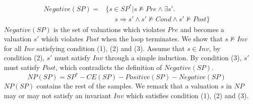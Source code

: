 \begin{align*}
    Negative(SP) = & \{s \in SP^* | s \not \models \mathit{Pre} \land \exists s'. \\
    & ~~~~~~s \Rightarrow s' \land s' \not \models Cond \land s' \not \models Post\}
\end{align*}
$Negative(SP)$ is the set of valuations which violates $Pre$ and becomes a valuation $s'$ which violates $Post$ when the loop terminates. We show that $s \not \models Inv$ for all $Inv$ satisfying condition (1), (2) and (3). Assume that $s \in Inv$, by condition (2), $s'$ must satisfy $Inv$ through a simple induction. By condition (3), $s'$ must satisfy $Post$, which contradicts the definition of $Negative(SP)$.
\[    NP(SP) = SP^* - CE(SP) - Positive(SP) - Negative(SP)
\]
$NP(SP)$ contains the rest of the samples. We remark that a valuation $s$ in $NP$ may or may not satisfy an invariant $Inv$ which satisfies condition (1), (2) and (3).

